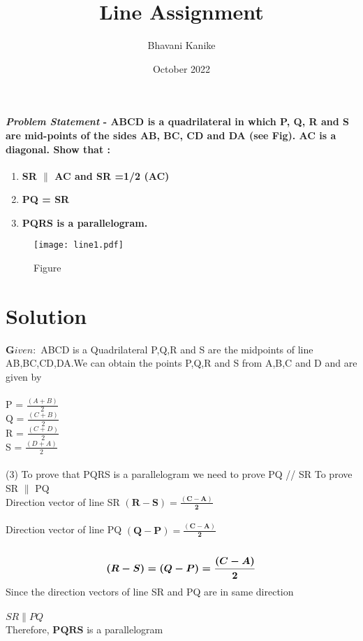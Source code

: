 \documentclass[journal,10pt,twocolumn]{article}
\title{\textbf{Line Assignment}}
\author{Bhavani Kanike}
\date{October 2022}
\begin{document}
\maketitle
\paragraph{\textit{Problem Statement} - ABCD is a quadrilateral in which P, Q, R and S are mid-points of the sides AB, BC, CD and DA (see Fig). AC is a diagonal. 
Show that :}
\begin{enumerate}
\item \textbf{ SR $\parallel$ AC and SR =1/2 (AC)}
\item \textbf{ PQ = SR}
\item \textbf{ PQRS is a parallelogram.}
\end{enumerate}

\begin{figure}[h]
\centering
\texttt{[image: line1.pdf]}
\caption{Figure}
\label{fig:triangle}
\end{figure}

\section*{Solution}

$\boldsymbol Given :$  ABCD is a Quadrilateral P,Q,R and S are the midpoints of line AB,BC,CD,DA.We can obtain the points P,Q,R and S from A,B,C and D and are given by\\\\
\boldmath
 P = $\frac{(A+B)}{2}$\\
 Q = $\frac{(C+B)}{2}$\\
 R = $\frac{(C+D)}{2}$\\
 S = $\frac{(D+A)}{2}$\\\\
\unboldmath
(3) To prove that PQRS is a parallelogram we need to prove  PQ // SR
To prove SR $\parallel$ PQ\\
Direction vector of line SR  $\boldsymbol {(R-S) =  \frac{(C-A)}{2}}$\\\\
Direction vector of line PQ  $\boldsymbol {(Q-P)= \frac{(C-A)}{2}}$\\\\
\begin{equation}
	\boldsymbol {(R-S) = (Q-P) = \frac{(C-A)}{2}}\\
\end{equation}
Since the direction vectors of line SR and PQ are in same direction\\\\
$SR \parallel PQ$\\
Therefore,
$\boldsymbol{ PQRS }$ is a parallelogram\\\\
\end{document}
